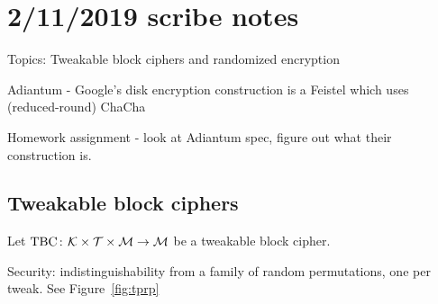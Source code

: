 \documentclass{article}
\newcommand{\keyspace}{\calK}
\newcommand{\tbc}{\text{TBC}}
\newcommand{\tweakspace}{\calT}
\begin{document}
\iffalse
\section*{2/11/2019 scribe notes}

Topics: Tweakable block ciphers and randomized encryption

Adiantum - Google's disk encryption construction is a Feistel which uses (reduced-round) ChaCha

Homework assignment - look at Adiantum spec, figure out what their construction is.

\subsection*{Tweakable block ciphers}
Let $\tbc\Colon\keyspace\times\tweakspace\times\msgspace\rightarrow\msgspace$ be a tweakable block cipher.

Security: indistinguishability from a family of random permutations, one per tweak. See Figure~\ref{fig:tprp}
\end{document}
